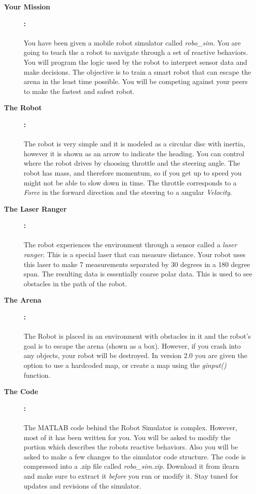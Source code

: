 \documentclass[11pt]{article}
\newcommand{\VER}{2.0 }
\begin{document}
	\begin{description}
		
		\item [\textbf{Your Mission}]\textbf{:} \\\\
		You have been given a mobile robot simulator called {\it robo\_sim}. You are going to teach the a robot to navigate through a set of reactive behaviors. You will program the logic used by the robot to interpret sensor data and make decisions. The objective is to train a smart robot that can escape the arena in the least time possible. You will be competing against your peers to make the fastest and safest robot.    

		\item [\textbf{The Robot}]\textbf{:} \\\\
		The robot is very simple and it is modeled as a circular disc with inertia, however it is shown as an arrow to indicate the heading. You can control where the robot drives by choosing throttle and the steering angle. The robot has mass, and therefore momentum, so if you get up to speed you might not be able to slow down in time. The throttle corresponds to a {\it Force} in the forward direction and the steering to a angular {\it Velocity}. 

		\item [\textbf{The Laser Ranger}]\textbf{:} \\\\
		The robot experiences the environment through a sensor called a {\it laser ranger}. This is a special laser that can measure distance. Your robot uses this laser to make 7 measurements separated by 30 degrees in a 180  degree span. The resulting data is essentially coarse polar data. This is used to see obstacles in the path of the robot.			

		\item [\textbf{The Arena}]\textbf{:} \\\\
		The Robot is placed in an environment with obstacles in it and the robot's goal is to escape the arena (shown as a box). However, if you crash into any objects, your robot will be destroyed. In version \VER you are given the option to use a hardcoded map, or create a map using the {\it ginput()} function.
			
		\item [\textbf{The Code}]\textbf{:} \\\\
		The MATLAB code behind the Robot Simulator is complex. However, most of it has been written for you. You will be asked to modify the portion which describes the robots reactive behaviors. Also you will be asked to make a few changes to the simulator code structure. The code is compressed into a .zip file called {\it robo\_sim.zip}. Download it from ilearn and make sure to extract it {\it before} you run or modify it. Stay tuned for updates and revisions of the simulator.


\end{description}
\end{document}
